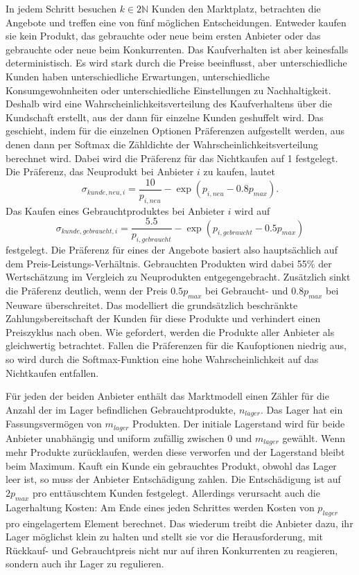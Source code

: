 In jedem Schritt besuchen $k \in 2\mathbb{N}$ Kunden den Marktplatz, betrachten die Angebote und treffen eine von fünf möglichen Entscheidungen.
Entweder kaufen sie kein Produkt, das gebrauchte oder neue beim ersten Anbieter oder das gebrauchte oder neue beim Konkurrenten.
Das Kaufverhalten ist aber keinesfalls deterministisch.
Es wird stark durch die Preise beeinflusst, aber unterschiedliche Kunden haben unterschiedliche Erwartungen, unterschiedliche Konsumgewohnheiten oder unterschiedliche Einstellungen zu Nachhaltigkeit.
Deshalb wird eine Wahrscheinlichkeitsverteilung des Kaufverhaltens über die Kundschaft erstellt, aus der dann für einzelne Kunden geshuffelt wird.
Das geschieht, indem für die einzelnen Optionen Präferenzen aufgestellt werden, aus denen dann per Softmax die Zähldichte der Wahrscheinlichkeitsverteilung berechnet wird.
Dabei wird die Präferenz für das Nichtkaufen auf 1 festgelegt.
Die Präferenz, das Neuprodukt bei Anbieter $i$ zu kaufen, lautet
\begin{equation}
	\sigma_{kunde, neu, i} = \frac{10}{p_{i, neu}} - \exp{(p_{i, neu} - 0.8 p_{max})}.
\end{equation}
Das Kaufen eines Gebrauchtproduktes bei Anbieter $i$ wird auf
\begin{equation}
	\sigma_{kunde, gebraucht, i} = \frac{5.5}{p_{i, gebraucht}} - \exp{(p_{i, gebraucht} - 0.5 p_{max})}
\end{equation}
festgelegt.
Die Präferenz für eines der Angebote basiert also hauptsächlich auf dem Preis-Leistungs-Verhältnis.
Gebrauchten Produkten wird dabei 55\% der Wertschätzung im Vergleich zu Neuprodukten entgegengebracht.
Zusätzlich sinkt die Präferenz deutlich, wenn der Preis $0.5 p_{max}$ bei Gebraucht- und $0.8 p_{max}$ bei Neuware überschreitet.
Das modelliert die grundsätzlich beschränkte Zahlungsbereitschaft der Kunden für diese Produkte und verhindert einen Preiszyklus nach oben.
Wie gefordert, werden die Produkte aller Anbieter als gleichwertig betrachtet.
Fallen die Präferenzen für die Kaufoptionen niedrig aus, so wird durch die Softmax-Funktion eine hohe Wahrscheinlichkeit auf das Nichtkaufen entfallen.

Für jeden der beiden Anbieter enthält das Marktmodell einen Zähler für die Anzahl der im Lager befindlichen Gebrauchtprodukte, $n_{lager}$.
Das Lager hat ein Fassungsvermögen von $m_{lager}$ Produkten.
Der initiale Lagerstand wird für beide Anbieter unabhängig und uniform zufällig zwischen $0$ und $m_{lager}$ gewählt.
Wenn mehr Produkte zurücklaufen, werden diese verworfen und der Lagerstand bleibt beim Maximum.
Kauft ein Kunde ein gebrauchtes Produkt, obwohl das Lager leer ist, so muss der Anbieter Entschädigung zahlen.
Die Entschädigung ist auf $2 p_{max}$ pro enttäuschtem Kunden festgelegt.
Allerdings verursacht auch die Lagerhaltung Kosten: Am Ende eines jeden Schrittes werden Kosten von $p_{lager}$ pro eingelagertem Element berechnet.
Das wiederum treibt die Anbieter dazu, ihr Lager möglichst klein zu halten und stellt sie vor die Herausforderung, mit Rückkauf- und Gebrauchtpreis nicht nur auf ihren Konkurrenten zu reagieren, sondern auch ihr Lager zu regulieren.

